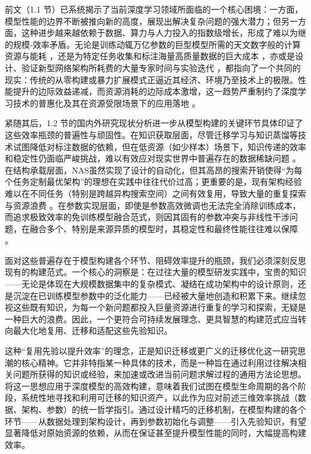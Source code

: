 \documentclass[../main.tex]{subfiles}
\begin{document}

前文（1.1 节）已系统揭示了当前深度学习领域所面临的一个核心困境：一方面，模型性能的边界不断被推向新的高度，展现出解决复杂问题的强大潜力；但另一方面，这种进步越来越依赖于数据、算力与人力投入的指数级增长，形成了难以为继的规模-效率矛盾。无论是训练动辄万亿参数的巨型模型所需的天文数字般的计算资源与能耗 ，还是为特定任务收集和标注海量高质量数据的巨大成本 ，亦或是设计、验证新型网络架构所耗费的大量专家时间与实验迭代 ，都指向了一个共同的现实：传统的从零构建或暴力扩展模式正逼近其经济、环境乃至技术上的极限。性能提升的边际效益递减，而资源消耗的边际成本激增，这一趋势严重制约了深度学习技术的普惠化及其在资源受限场景下的应用落地 。

紧随其后，1.2 节的国内外研究现状分析进一步从模型构建的关键环节具体印证了这些效率瓶颈的普遍性与顽固性。在知识获取层面，尽管迁移学习与知识蒸馏等技术试图降低对标注数据的依赖，但在低资源（如少样本）场景下，知识传递的效率和稳定性仍面临严峻挑战，难以有效应对现实世界中普遍存在的数据稀缺问题 。在结构承载层面，NAS虽然实现了设计的自动化，但其高昂的搜索开销使得“为每个任务定制最优架构”的理想在实践中往往代价过高；更重要的是，现有架构经验难以在不同任务（特别是跨越异构搜索空间）之间有效复用，导致大量的重复探索与资源浪费 。在参数实现层面，即使是参数高效微调也无法完全消除训练成本，而追求极致效率的免训练模型融合范式，则因其固有的参数冲突与非线性干涉问题，在融合多个、特别是来源异质的模型时，其稳定性和最终性能往往难以保障 。

面对这些普遍存在于模型构建各个环节、阻碍效率提升的瓶颈，我们必须深刻反思现有的构建范式。一个核心的洞察是：在过往大量的模型研发实践中，宝贵的知识——无论是体现在大规模数据集中的复杂模式、凝结在成功架构中的设计原则，还是沉淀在已训练模型参数中的泛化能力——已经被大量地创造和积累下来。继续忽视这些既有知识，为每一个新问题都投入巨量资源进行重复的学习和探索，无疑是一种巨大的浪费。因此，一个更符合可持续发展理念、更具智慧的构建范式应当转向最大化地复用、迁移和适配这些先验知识。

这种“复用先验以提升效率”的理念，正是知识迁移或更广义的迁移优化这一研究思潮的核心精神。它并非特指某一种具体的技术，而是一种旨在通过利用过往解决相关问题所获得的知识或经验，来加速或改进当前问题求解过程的通用方法论思想。将这一思想应用于深度模型的高效构建，意味着我们试图在模型生命周期的各个阶段，系统性地寻找和利用可迁移的知识资产，以此作为应对前述三维效率挑战（数据、架构、参数）的统一哲学指引。通过设计精巧的迁移机制，在模型构建的各个环节——从数据处理到架构设计，再到参数初始化与调整——引入先验知识，有望显著降低对原始资源的依赖，从而在保证甚至提升模型性能的同时，大幅提高构建效率。
\end{document}
